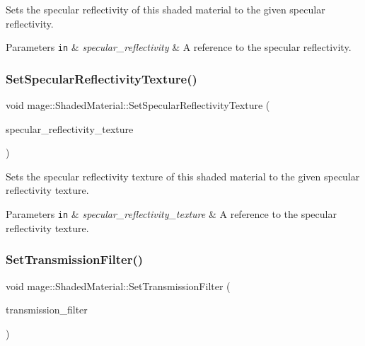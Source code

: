 Sets the specular reflectivity of this shaded material to the given specular reflectivity.


\begin{DoxyParams}[1]{Parameters}
\mbox{\tt in}  & {\em specular\+\_\+reflectivity} & A reference to the specular reflectivity. \\
\hline
\end{DoxyParams}
\hypertarget{structmage_1_1_shaded_material_a8bd9bf0a0b1f636a74d3452c58b5b98d}{}\label{structmage_1_1_shaded_material_a8bd9bf0a0b1f636a74d3452c58b5b98d} 
\subsubsection{\texorpdfstring{Set\+Specular\+Reflectivity\+Texture()}{SetSpecularReflectivityTexture()}}
{\footnotesize\ttfamily void mage\+::\+Shaded\+Material\+::\+Set\+Specular\+Reflectivity\+Texture (\begin{DoxyParamCaption}\item[{\hyperlink{namespacemage_a1e01ae66713838a7a67d30e44c67703e}{Shared\+Ptr}$<$ \hyperlink{classmage_1_1_texture}{Texture} $>$}]{specular\+\_\+reflectivity\+\_\+texture }\end{DoxyParamCaption})}

Sets the specular reflectivity texture of this shaded material to the given specular reflectivity texture.


\begin{DoxyParams}[1]{Parameters}
\mbox{\tt in}  & {\em specular\+\_\+reflectivity\+\_\+texture} & A reference to the specular reflectivity texture. \\
\hline
\end{DoxyParams}
\hypertarget{structmage_1_1_shaded_material_a8be0968eae5daf3d566ee063925671c6}{}\label{structmage_1_1_shaded_material_a8be0968eae5daf3d566ee063925671c6} 
\subsubsection{\texorpdfstring{Set\+Transmission\+Filter()}{SetTransmissionFilter()}\hspace{0.1cm}{\footnotesize\ttfamily [1/2]}}
{\footnotesize\ttfamily void mage\+::\+Shaded\+Material\+::\+Set\+Transmission\+Filter (\begin{DoxyParamCaption}\item[{const \hyperlink{structmage_1_1_r_g_b_spectrum}{R\+G\+B\+Spectrum} \&}]{transmission\+\_\+filter }\end{DoxyParamCaption})}

